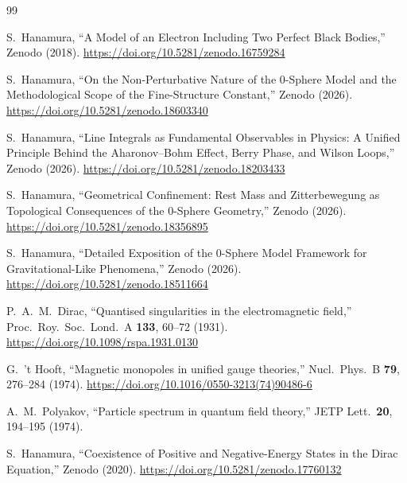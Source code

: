 \documentclass[12pt,letterpaper]{article}
\begin{document}
\begin{thebibliography}{99}

S.~Hanamura,
``A Model of an Electron Including Two Perfect Black Bodies,''
Zenodo (2018).
\href{https://doi.org/10.5281/zenodo.16759284}{https://doi.org/10.5281/zenodo.16759284}

S.~Hanamura,
``On the Non-Perturbative Nature of the 0-Sphere Model and the Methodological Scope of the Fine-Structure Constant,''
Zenodo (2026).
\href{https://doi.org/10.5281/zenodo.18603340}{https://doi.org/10.5281/zenodo.18603340}

S.~Hanamura,
``Line Integrals as Fundamental Observables in Physics: A Unified Principle Behind the Aharonov--Bohm Effect, Berry Phase, and Wilson Loops,''
Zenodo (2026).
\href{https://doi.org/10.5281/zenodo.18203433}{https://doi.org/10.5281/zenodo.18203433}

S.~Hanamura,
``Geometrical Confinement: Rest Mass and Zitterbewegung as Topological Consequences of the 0-Sphere Geometry,''
Zenodo (2026).
\href{https://doi.org/10.5281/zenodo.18356895}{https://doi.org/10.5281/zenodo.18356895}

S.~Hanamura,
``Detailed Exposition of the 0-Sphere Model Framework for Gravitational-Like Phenomena,''
Zenodo (2026).
\href{https://doi.org/10.5281/zenodo.18511664}{https://doi.org/10.5281/zenodo.18511664}

P.~A.~M.~Dirac,
``Quantised singularities in the electromagnetic field,''
Proc.\ Roy.\ Soc.\ Lond.\ A \textbf{133}, 60--72 (1931).
\href{https://doi.org/10.1098/rspa.1931.0130}{https://doi.org/10.1098/rspa.1931.0130}

G.~'t Hooft,
``Magnetic monopoles in unified gauge theories,''
Nucl.\ Phys.\ B \textbf{79}, 276--284 (1974).
\href{https://doi.org/10.1016/0550-3213(74)90486-6}{https://doi.org/10.1016/0550-3213(74)90486-6}

A.~M.~Polyakov,
``Particle spectrum in quantum field theory,''
JETP Lett.\ \textbf{20}, 194--195 (1974).

S.~Hanamura,
``Coexistence of Positive and Negative-Energy States in the Dirac Equation,''
Zenodo (2020).
\href{https://doi.org/10.5281/zenodo.17760132}{https://doi.org/10.5281/zenodo.17760132}


\end{thebibliography}
\end{document}
